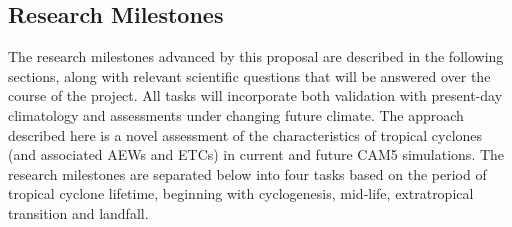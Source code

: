 \documentclass[11pt]{article}
\begin{document}

\subsection{Research Milestones} \label{sec:ResearchMilestones}

The research milestones advanced by this proposal are described in the following sections, along with relevant scientific questions that will be answered over the course of the project.  All tasks will incorporate both validation with present-day climatology and assessments under changing future climate.  The approach described here is a novel assessment of the characteristics of tropical cyclones (and associated AEWs and ETCs) in current and future CAM5 simulations.  The research milestones are separated below into four tasks based on the period of tropical cyclone lifetime, beginning with cyclogenesis, mid-life, extratropical transition and landfall.
\end{document}
